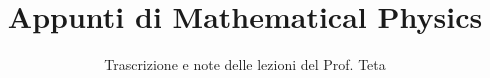 \documentclass[a4paper,12pt]{article}
\title{Appunti di Mathematical Physics}
\author{Trascrizione e note delle lezioni del Prof. Teta}
\date{}
\begin{document}
\maketitle
\projectintro
\tableofcontents
\newpage

% 
% 
% 
% 
% 
\end{document}
